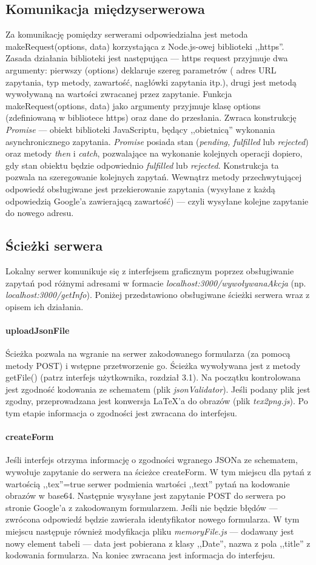 \subsection{Komunikacja międzyserwerowa}
Za komunikację pomiędzy serwerami odpowiedzialna jest metoda makeRequest(options, data) korzystająca z Node.js-owej biblioteki ,,https''. Zasada działania biblioteki jest następująca --- https request przyjmuje dwa argumenty: pierwszy (options) deklaruje szereg parametrów ( adres URL zapytania, typ metody, zawartość, nagłówki zapytania itp.), drugi jest metodą wywoływaną na wartości zwracanej przez zapytanie. 
\ind Funkcja makeRequest(options, data) jako argumenty przyjmuje klasę options (zdefiniowaną w bibliotece https) oraz dane do przesłania. Zwraca konstrukcję \textit{Promise} --- obiekt biblioteki JavaScriptu, będący ,,obietnicą'' wykonania asynchronicznego zapytania. \textit{Promise} posiada stan (\textit{pending, fulfilled} lub \textit{rejected}) oraz metody \textit{then} i \textit{catch}, pozwalające na wykonanie kolejnych operacji dopiero, gdy stan obiektu będzie odpowiednio \textit{fulfilled} lub \textit{rejected}. Konstrukcja ta pozwala na szeregowanie kolejnych zapytań. Wewnątrz metody przechwytującej odpowiedź obsługiwane jest przekierowanie zapytania (wysyłane z każdą odpowiedzią Google'a zawierającą zawartość) --- czyli wysyłane kolejne zapytanie do nowego adresu.
\subsection{Ścieżki serwera}
Lokalny serwer komunikuje się z interfejsem graficznym poprzez obsługiwanie zapytań pod różnymi adresami w formacie \textit{localhost:3000/wywoływanaAkcja} (np. \textit{localhost:3000/getInfo}).
Poniżej przedstawiono obsługiwane ścieżki serwera wraz z opisem ich działania.
\paragraph{uploadJsonFile} Ścieżka pozwala na wgranie na serwer zakodowanego formularza (za pomocą metody POST) i wstępne przetworzenie go. Ścieżka wywoływana jest z metody getFile() (patrz interfejs użytkownika, rozdział 3.1). Na początku kontrolowana jest zgodność kodowania ze schematem (plik \textit{jsonValidator}). Jeśli podany plik jest zgodny, przeprowadzana jest konwersja \LaTeX{}'a do obrazów (plik \textit{tex2png.js}). Po tym etapie informacja o zgodności jest zwracana do interfejsu.
\paragraph{createForm} Jeśli interfejs otrzyma informację o zgodności wgranego JSONa ze schematem, wywołuje zapytanie do serwera na ścieżce createForm. W tym miejscu dla pytań z wartością ,,tex''=true serwer podmienia wartości ,,text'' pytań na kodowanie obrazów w base64. Następnie wysyłane jest zapytanie POST do serwera po stronie Google'a z zakodowanym formularzem. Jeśli nie będzie błędów --- zwrócona odpowiedź będzie zawierała identyfikator nowego formularza. W tym miejscu następuje również modyfikacja pliku \textit{memoryFile.js} --- dodawany jest nowy element tabeli --- data jest pobierana z klasy ,,Date'', nazwa z pola ,,title'' z kodowania formularza. Na koniec zwracana jest informacja do interfejsu.
